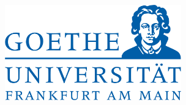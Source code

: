 \begin{titlepage}



\includegraphics[width=3in]{images/Goethe-Logo.png}\\[0.4cm]
\HRule \\[0.4cm]
\\[0.1cm]
 

\vfill %

\end{titlepage}